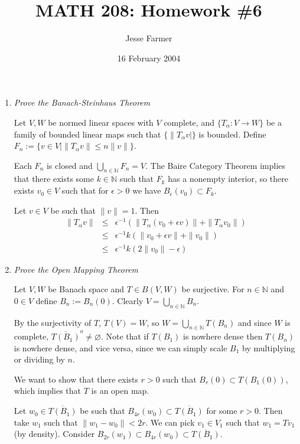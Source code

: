 \documentclass[11pt]{article}
\title{MATH 208: Homework \#6}
\author{Jesse Farmer}
\date{16 February 2004}
\begin{document}
\maketitle
\begin{enumerate}

\item  \emph{Prove the Banach-Steinhaus Theorem}

Let $V,W$ be normed linear spaces with $V$ complete, and $\{T_\alpha:V \rightarrow W\}$ be a family of bounded linear maps such that $\{\|T_\alpha v|\}$ is bounded.  Define $F_n := \{v \in V \mid \|T_\alpha v\| \leq n \|v\|\}$.

Each $F_n$ is closed and $\bigcup_{n \in \mathbb{N}}F_n = V$.  The Baire Category Theorem implies that there exists some $k \in \mathbb{N}$ such that $F_k$ has a nonempty interior, so there exists $v_0 \in V$ such that for $\epsilon > 0$ we have $B_\epsilon(v_0) \subset F_k$.

Let $v \in V$ be such that $\|v\| = 1$.  Then \begin{eqnarray*}
\|T_\alpha v\| &\leq& \epsilon^{-1}(\|T_\alpha(v_0 + \epsilon v)\| + \|T_\alpha v_0\|) \\
&\leq& \epsilon^{-1}k(\|v_0 + \epsilon v\| + \|v_0\|) \\
&\leq& \epsilon^{-1}k(2\|v_0\| - \epsilon)
\end{eqnarray*}

\item \emph{Prove the Open Mapping Theorem}

Let $V,W$ be Banach space and $T \in B(V,W)$ be surjective.  For $n \in \mathbb{N}$ and $0 \in V$ define $B_n := B_n(0)$.  Clearly $V = \bigcup_{n \in \mathbb{N}} B_n$.

By the surjectivity of $T$, $T(V) = W$, so $W = \bigcup_{n \in \mathbb{N}} T(B_n)$ and since $W$ is complete, $\overline{T(B_1)}^o \neq \varnothing$.  Note that if $T(B_1)$ is nowhere dense then $T(B_n)$ is nowhere dense, and vice versa, since we can simply scale $B_1$ by multiplying or dividing by $n$.

We want to show that there exists $r > 0$ such that $B_r(0) \subset T(B_1(0))$, which implies that $T$ is an open map.

Let $w_0 \in \overline{T(B_1)}$ be such that $B_{4r}(w_0) \subset \overline{T(B_1)}$ for some $r > 0$.  Then take $w_1$ such that $\|w_1 - w_0\| < 2r$.  We can pick $v_1 \in V_1$ such that $w_1 = Tv_1$ (by density).  Consider $B_{2r}(w_1) \subset B_{4r}(w_0) \subset \overline{T(B_1)}$.


\end{enumerate}
\end{document}
